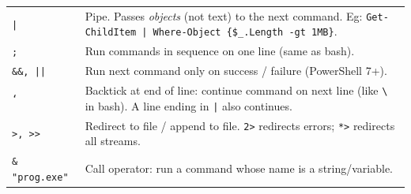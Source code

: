 \begin{tabularx}{\linewidth}{lX}
    \texttt{|} & Pipe. Passes \emph{objects} (not text) to the next command. Eg: \texttt{Get-ChildItem | Where-Object \{\$\_.Length -gt 1MB\}}.\\
    \texttt{;} & Run commands in sequence on one line (same as bash).\\
    \texttt{\&\&, ||} & Run next command only on success / failure (PowerShell 7+).\\
    \texttt{`} & Backtick at end of line: continue command on next line (like \texttt{\textbackslash} in bash). A line ending in \texttt{|} also continues.\\
    \texttt{>, >>} & Redirect to file / append to file. \texttt{2>} redirects errors; \texttt{*>} redirects all streams.\\
    \texttt{\& "prog.exe"} & Call operator: run a command whose name is a string/variable.\\
    \hline
\end{tabularx}

\vfill\null
\columnbreak

